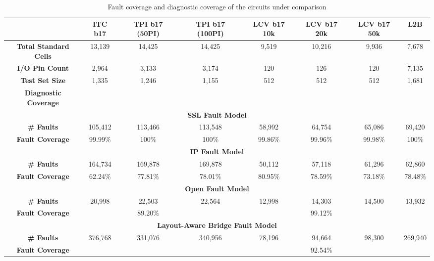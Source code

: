 \documentclass[journal]{IEEEtran}
\begin{document}
\begin{table}[h]
	\caption{Fault coverage and diagnostic coverage of the circuits under comparison}
	\begin{center}
		\begin{tabular}{ |c|c|c|c|c|c|c|c| } 
			\hline
			 & ITC b17 & TPI b17 (50PI) & TPI b17 (100PI) & LCV b17 10k & LCV b17 20k & LCV b17 50k & L2B \\
			\hline
			\textbf{Total Standard Cells} & 13,139 & 14,425 & 14,425 & 9,519 & 10,216 & 9,936 & 7,678 \\ 
			\hline
			\textbf{I/O Pin Count} & 2,964 & 3,133 & 3,174 & 120 & 126 & 120 & 7,135 \\ 
			\hline
			\textbf{Test Set Size} & 1,335 & 1,246 & 1,155 & 512 & 512 & 512 & 1,681 \\
			\hline
			\textbf{Diagnostic Coverage} & & & & & & & \\
			\hline
			\multicolumn{8}{|c|}{\textbf{SSL Fault Model}} \\
			\hline
			\textbf{\# Faults} & 105,412 & 113,466 & 113,548 & 58,992 & 64,754 & 65,086 & 69,420 \\
			\textbf{Fault Coverage} & 99.99\% & 100\% & 100\% & 99.86\% & 99.96\% & 99.98\%  & 100\% \\
			\hline
			
			\multicolumn{8}{|c|}{\textbf{IP Fault Model}} \\
			\hline
			\textbf{\# Faults} & 164,734 & 169,878 & 169,878 & 50,112 & 57,118 & 61,296 & 62,860 \\
			\textbf{Fault Coverage} & 62.24\% & 77.81\% & 78.01\% & 80.95\% & 78.59\% & 73.18\% & 78.48\% \\
			\hline
			
			\multicolumn{8}{|c|}{\textbf{Open Fault Model}} \\
			\hline
			\textbf{\# Faults} & 20,998 & 22,503 & 22,564 & 12,998 & 14,303 & 14,500 & 13,932 \\
			\textbf{Fault Coverage} &  & 89.20\% &  &  & 99.12\% &  &  \\
			\hline
			
			\multicolumn{8}{|c|}{\textbf{Layout-Aware Bridge Fault Model}} \\
			\hline
			\textbf{\# Faults} & 376,768 & 331,076 & 340,956 & 78,196 & 94,664 & 98,300 & 269,940 \\
			\textbf{Fault Coverage} & & & & & 92.54\% & &  \\
			\hline
			
		\end{tabular}
	\end{center}
	\label{table_coverage}
\end{table}
\end{document}

